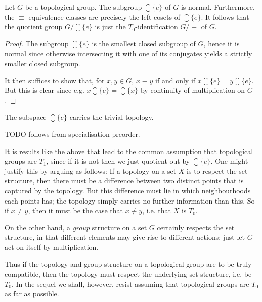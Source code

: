 \documentclass[article, a4paper, 11pt, oneside]{memoir}
\numberwithin{equation}{chapter}
\begin{document}
\begin{proposition}
    \label{thm:quotient-group-T0-identification}
    Let $G$ be a topological group. The subgroup $\closure{\{e\}}$ of $G$ is normal. Furthermore, the $\equiv$-equivalence classes are precisely the left cosets of $\closure{\{e\}}$. It follows that the quotient group $G / \closure{\{e\}}$ is just the $T_0$-identification $G/{\equiv}$ of $G$.
\end{proposition}

\begin{proof}
    The subgroup $\closure{\{e\}}$ is the smallest closed subgroup of $G$, hence it is normal since otherwise intersecting it with one of its conjugates yields a strictly smaller closed subgroup.

    It then suffices to show that, for $x,y \in G$, $x \equiv y$ if and only if $x \closure{\{e\}} = y \closure{\{e\}}$. But this is clear since e.g. $x \closure{\{e\}} = \closure{\{x\}}$ by continuity of multiplication on $G$.
\end{proof}


\begin{corollary}
    \label{cor:closure-of-e-trivial-topology}
    The subspace $\closure{\{e\}}$ carries the trivial topology.
\end{corollary}

TODO follows from specialisation preorder.


It is results like the above that lead to the common assumption that topological groups are $T_1$, since if it is not then we just quotient out by $\closure{\{e\}}$. One might justify this by arguing as follows: If a topology on a set $X$ is to respect the set structure, then there must be a difference between two distinct points that is captured by the topology. But this difference must lie in which neighbourhoods each points has; the topology simply carries no further information than this. So if $x \neq y$, then it must be the case that $x \not\equiv y$, i.e. that $X$ is $T_0$.

On the other hand, a \emph{group} structure on a set $G$ certainly respects the set structure, in that different elements may give rise to different actions: just let $G$ act on itself by multiplication.

Thus if the topology and group structure on a topological group are to be truly compatible, then the topology must respect the underlying set structure, i.e. be $T_0$. In the sequel we shall, however, resist assuming that topological groups are $T_0$ as far as possible.
\end{document}
